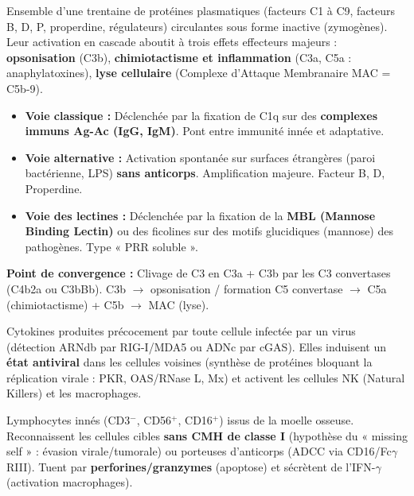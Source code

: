 \documentclass[11pt]{article}
\newcommand{\cle}[1]{{\popxbold\color{popdark}#1}}
\begin{document}
\begin{definition}
Ensemble d'une trentaine de protéines plasmatiques (facteurs C1 à C9, facteurs B, D, P, properdine, régulateurs) circulantes sous forme inactive (zymogènes). Leur activation en cascade aboutit à trois effets effecteurs majeurs : \textbf{opsonisation} (C3b), \textbf{chimiotactisme et inflammation} (C3a, C5a : anaphylatoxines), \textbf{lyse cellulaire} (Complexe d'Attaque Membranaire MAC = C5b-9).
\end{definition}

\begin{propriete}
\begin{itemize}
\item \textbf{Voie classique :} Déclenchée par la fixation de C1q sur des \textbf{complexes immuns Ag-Ac (IgG, IgM)}. Pont entre immunité innée et adaptative.
\item \textbf{Voie alternative :} Activation spontanée sur surfaces étrangères (paroi bactérienne, LPS) \textbf{sans anticorps}. Amplification majeure. Facteur B, D, Properdine.
\item \textbf{Voie des lectines :} Déclenchée par la fixation de la \textbf{MBL (Mannose Binding Lectin)} ou des ficolines sur des motifs glucidiques (mannose) des pathogènes. Type « PRR soluble ».
\end{itemize}
\textbf{Point de convergence :} Clivage de C3 en C3a + C3b par les C3 convertases (C4b2a ou C3bBb). C3b $\rightarrow$ opsonisation / formation C5 convertase $\rightarrow$ C5a (chimiotactisme) + C5b $\rightarrow$ MAC (lyse).
\end{propriete}

\begin{definition}
Cytokines produites précocement par toute cellule infectée par un virus (détection ARNdb par RIG-I/MDA5 ou ADNc par cGAS). Elles induisent un \textbf{état antiviral} dans les cellules voisines (synthèse de protéines bloquant la réplication virale : PKR, OAS/RNase L, Mx) et activent les \cle{cellules NK} (Natural Killers) et les macrophages.
\end{definition}

\begin{definition}
Lymphocytes innés (CD3$^-$, CD56$^+$, CD16$^+$) issus de la moelle osseuse. Reconnaissent les cellules cibles \textbf{sans CMH de classe I} (hypothèse du « missing self » : évasion virale/tumorale) ou porteuses d'anticorps (ADCC via CD16/Fc$\gamma$RIII). Tuent par \textbf{perforines/granzymes} (apoptose) et sécrètent de l'IFN-$\gamma$ (activation macrophages).
\end{definition}
\end{document}
